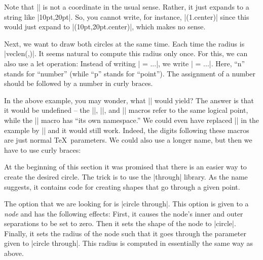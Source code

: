 Note that || is not a coordinate in the usual sense. Rather, it
just expands to a string like |10pt,20pt|. So, you cannot write, for
instance, |(\p1.center)| since this would just expand to
|(10pt,20pt.center)|, which makes no sense.

Next, we want to draw both circles at the same time. Each time the
radius is |veclen(,)|. It seems natural to compute this radius
only once. For this, we can also use a let operation: Instead of
writing | = ...|, we write | = ...|. Here, ``n'' stands for
``number'' (while ``p'' stands for ``point''). The assignment of a
number should be followed by a number in curly braces.
\begin{codeexample}[]
\end{codeexample}
In the above example, you may wonder, what || would yield? The
answer is that it would be undefined -- the |\p|, |\x|, and |\y|
macros refer to the same logical point, while the |\n| macro has ``its
own namespace.'' We could even have replaced || in the example by
|| and it would still work. Indeed, the digits following these
macros are just normal \TeX\ parameters. We could also use a longer
name, but then we have to use curly braces:
\begin{codeexample}[]
\end{codeexample}

At the beginning of this section it was promised that there is an
easier way to create the desired circle. The trick is to use the
|through| library. As the name suggests, it contains code for creating
shapes that go through a given point.

The option that we are looking for is |circle through|. This option is
given to a \emph{node} and has the following effects: First, it causes
the node's inner and outer separations to be set to zero. Then it sets
the shape of the node to |circle|. Finally, it sets the radius of the
node such that it goes through the parameter given to
|circle through|. This radius is computed in essentially the same way
as above.

